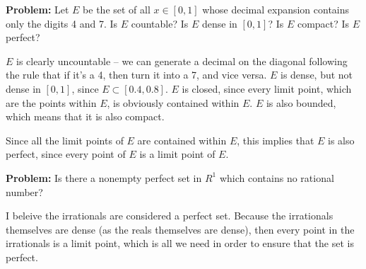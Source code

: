 \documentclass[10pt]{article}
\newenvironment{problem}{\textbf{Problem:}}{}
\begin{document}
	\begin{problem}
		Let \( E \) be the set of all \( x \in [0, 1] \) whose decimal expansion contains only the digits 4 and 7.
		Is \( E \) countable? Is \( E \) dense in \( [0, 1] \)? Is \( E \) compact? Is \( E \) perfect?
	\end{problem}

	\begin{solution}
		\( E \) is clearly uncountable -- we can generate a decimal on the diagonal following the rule that if it's 
		a 4, then turn it into a 7, and vice versa. \( E \) is dense, but not dense 
		in \( [0, 1] \), since \( E \subset [0.4, 0.8] \). \( E \) is closed, since 
		every limit point, which are the points within \( E \), is obviously contained within \( E \). 
		\( E \) is also bounded, which means that it is also compact. 

		Since all the limit points of \( E \) are contained within \( E \), this implies that \( E \) is 
		also perfect, since every point of \( E \) is a limit point of \( E \). 
	\end{solution}

	\begin{problem}
		Is there a nonempty perfect set in \( R^{1} \) which contains no rational number?
	\end{problem}

	\begin{solution}
		I beleive the irrationals are considered a perfect set. Because the irrationals themselves are dense 
		(as the reals themselves are dense), then every point in the irrationals is a limit point, which is 
		all we need in order to ensure that the set is perfect. 
	\end{solution}
\end{document}
